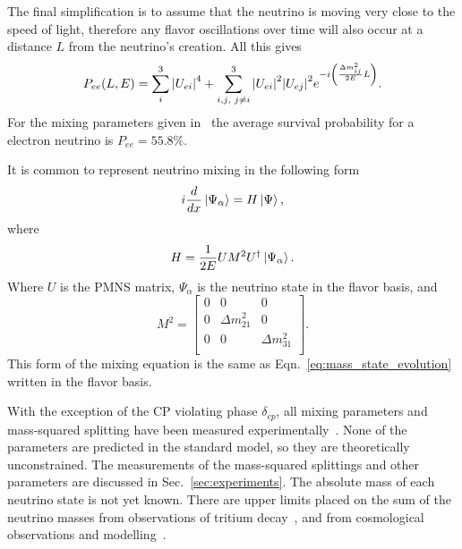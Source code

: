 The final simplification is to assume that the neutrino is moving very close
to the speed of light, therefore any flavor oscillations over time will also
occur at a distance $L$ from the neutrino's creation.
All this gives
\begin{equation}
    \label{eqn:pee_adiabatic}
    P_{ee}(L,E) = \sum_{i}^{3}\abs{U_{ei}}^4 +
    \sum_{i,j\text{, }j \ne i}^{3}
    \abs{U_{ei}}^2\abs{U_{ej}}^2e^{-i\left(\frac{\Delta m^{2}_{ij}}{2E}L\right)}\text{.}
\end{equation}
For the mixing parameters given in~\citep{PDG2016} the average survival probability
for a electron neutrino is $P_{ee} = 55.8\%$.

It is common to represent neutrino mixing in the following form
\begin{equation}
i\frac{d}{dx}\ket{\Psi_{\alpha}} = H\ket{\Psi}\text{,}
\label{eq:mixing_hamiltonian}
\end{equation}
where
\begin{equation}
    H = \frac{1}{2E}UM^{2}U^{\dagger}\ket{\Psi_{\alpha}}\text{.}
\end{equation}
Where $U$ is the PMNS matrix, $\Psi_{\alpha}$ is the neutrino state in the  flavor
basis, and
\begin{equation}
M^{2} = 
\begin{bmatrix}
    0 & 0 & 0  \\
    0 & \Delta m^{2}_{21} & 0  \\
    0 & 0 & \Delta m^{2}_{31}  \\
\end{bmatrix}\text{.}
\end{equation}
This form of the mixing equation is the same as Eqn.~\eqref{eq:mass_state_evolution}
written in the flavor basis.


With the exception of the CP violating phase $\delta_{cp}$, all mixing
parameters and mass-squared splitting have been measured experimentally~\citep{pdg_globalfit}.
None of the parameters are predicted in the standard model, so they are theoretically
unconstrained.
The measurements of the mass-squared splittings and
other parameters are discussed in Sec.~\ref{sec:experiments}.
The absolute mass of each neutrino state is not yet known.
There are upper limits placed on the sum of the neutrino masses from
observations of tritium decay~\citep{troitsk_mass}, and from cosmological
observations and modelling~\citep{cosmological_neutrino_mass}.

